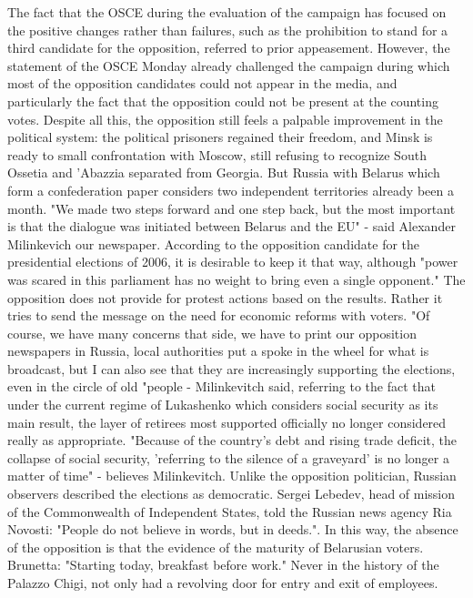 The fact that the OSCE during the evaluation of the campaign has focused on the positive changes rather than failures, such as the prohibition to stand for a third candidate for the opposition, referred to prior appeasement.
However, the statement of the OSCE Monday already challenged the campaign during which most of the opposition candidates could not appear in the media, and particularly the fact that the opposition could not be present at the counting votes.
Despite all this, the opposition still feels a palpable improvement in the political system: the political prisoners regained their freedom, and Minsk is ready to small confrontation with Moscow, still refusing to recognize South Ossetia and 'Abazzia separated from Georgia. But Russia with Belarus which form a confederation paper considers two independent territories already been a month.
"We made two steps forward and one step back, but the most important is that the dialogue was initiated between Belarus and the EU" - said Alexander Milinkevich our newspaper.
According to the opposition candidate for the presidential elections of 2006, it is desirable to keep it that way, although "power was scared in this parliament has no weight to bring even a single opponent."
The opposition does not provide for protest actions based on the results. Rather it tries to send the message on the need for economic reforms with voters.
"Of course, we have many concerns that side, we have to print our opposition newspapers in Russia, local authorities put a spoke in the wheel for what is broadcast, but I can also see that they are increasingly supporting the elections, even in the circle of old "people - Milinkevitch said, referring to the fact that under the current regime of Lukashenko which considers social security as its main result, the layer of retirees most supported officially no longer considered really as appropriate.
"Because of the country's debt and rising trade deficit, the collapse of social security, 'referring to the silence of a graveyard' is no longer a matter of time" - believes Milinkevitch.
Unlike the opposition politician, Russian observers described the elections as democratic.
Sergei Lebedev, head of mission of the Commonwealth of Independent States, told the Russian news agency Ria Novosti: "People do not believe in words, but in deeds.". In this way, the absence of the opposition is that the evidence of the maturity of Belarusian voters.
Brunetta: "Starting today, breakfast before work."
Never in the history of the Palazzo Chigi, not only had a revolving door for entry and exit of employees.
